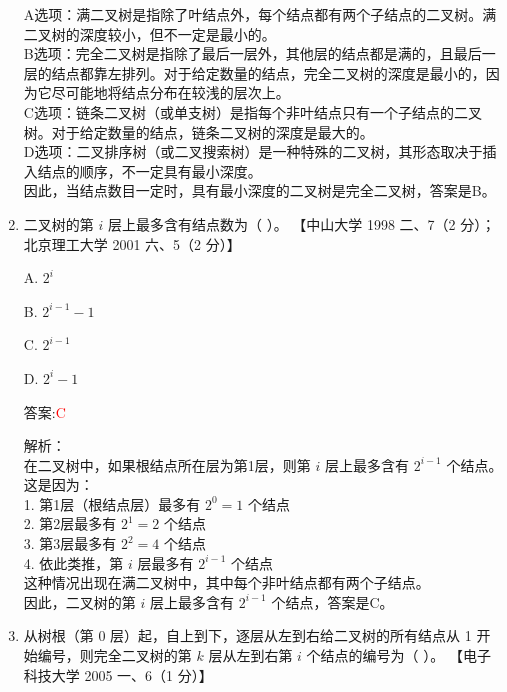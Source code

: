 \documentclass[lang=cn,newtx,10pt,scheme=chinese]{../../../elegantbook}
\begin{document}
\begin{enumerate}
    A选项：满二叉树是指除了叶结点外，每个结点都有两个子结点的二叉树。满二叉树的深度较小，但不一定是最小的。\\
    
    B选项：完全二叉树是指除了最后一层外，其他层的结点都是满的，且最后一层的结点都靠左排列。对于给定数量的结点，完全二叉树的深度是最小的，因为它尽可能地将结点分布在较浅的层次上。\\
    
    C选项：链条二叉树（或单支树）是指每个非叶结点只有一个子结点的二叉树。对于给定数量的结点，链条二叉树的深度是最大的。\\
    
    D选项：二叉排序树（或二叉搜索树）是一种特殊的二叉树，其形态取决于插入结点的顺序，不一定具有最小深度。\\
    
    因此，当结点数目一定时，具有最小深度的二叉树是完全二叉树，答案是B。\\  

    \item 二叉树的第 $i$ 层上最多含有结点数为（ ）。  
    【中山大学 1998 二、7（2 分）；北京理工大学 2001 六、5（2 分）】  

    A. $2^i$  


    B. $2^{i-1} - 1$  

    C. $2^{i-1}$  

    D. $2^{i} - 1$  
    
    答案:\textcolor{red}{C}
    
    解析：\\
    在二叉树中，如果根结点所在层为第1层，则第 $i$ 层上最多含有 $2^{i-1}$ 个结点。\\
    
    这是因为：\\
    1. 第1层（根结点层）最多有 $2^0 = 1$ 个结点\\
    2. 第2层最多有 $2^1 = 2$ 个结点\\
    3. 第3层最多有 $2^2 = 4$ 个结点\\
    4. 依此类推，第 $i$ 层最多有 $2^{i-1}$ 个结点\\
    
    这种情况出现在满二叉树中，其中每个非叶结点都有两个子结点。\\
    
    因此，二叉树的第 $i$ 层上最多含有 $2^{i-1}$ 个结点，答案是C。\\  

    \item 从树根（第 0 层）起，自上到下，逐层从左到右给二叉树的所有结点从 1 开始编号，则完全二叉树的第 $k$ 层从左到右第 $i$ 个结点的编号为（ ）。  
    【电子科技大学 2005 一、6（1 分）】  


\end{enumerate}
\end{document}
